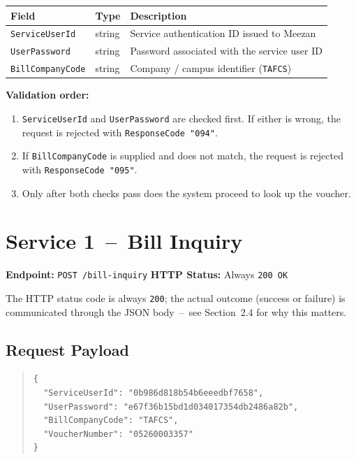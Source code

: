 \documentclass[11pt]{article}
\begin{document}
\begin{center}
\begin{tabular}{@{}lll@{}}
\toprule
\textbf{Field} & \textbf{Type} & \textbf{Description} \\
\midrule
\texttt{ServiceUserId} & string & Service authentication ID issued to Meezan \\
\texttt{UserPassword} & string & Password associated with the service user ID \\
\texttt{BillCompanyCode} & string & Company / campus identifier (\texttt{TAFCS}) \\
\bottomrule
\end{tabular}
\end{center}

\noindent\textbf{Validation order:}
\begin{enumerate}
    \item \texttt{ServiceUserId} and \texttt{UserPassword} are checked first. If either is wrong, the request is rejected with \texttt{ResponseCode "094"}.
    \item If \texttt{BillCompanyCode} is supplied and does not match, the request is rejected with \texttt{ResponseCode "095"}.
    \item Only after both checks pass does the system proceed to look up the voucher.
\end{enumerate}

\section{Service 1 \,--\, Bill Inquiry}
\textbf{Endpoint:} \texttt{POST /bill-inquiry} \hfill \textbf{HTTP Status:} Always \texttt{200 OK}

\noindent The HTTP status code is always \texttt{200}; the actual outcome (success or failure)
is communicated through the JSON body \,--\, see Section~2.4 for why this matters.

\subsection{Request Payload}
\begin{quote}
\begin{verbatim}
{
  "ServiceUserId": "0b986d818b54b6eeedbf7658",
  "UserPassword": "e67f36b15bd1d034017354db2486a82b",
  "BillCompanyCode": "TAFCS",
  "VoucherNumber": "05260003357"
}
\end{verbatim}
\end{quote}
\end{document}

